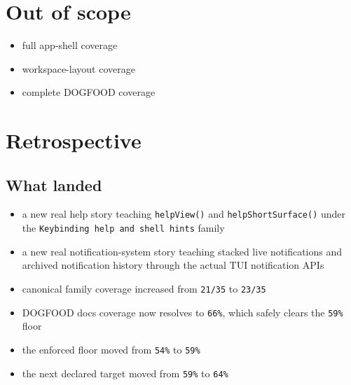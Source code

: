 \section{Out of scope}\label{record-075-out-of-scope}

\begin{itemize}
\tightlist
\item
  full app-shell coverage
\item
  workspace-layout coverage
\item
  complete DOGFOOD coverage
\end{itemize}

\section{Retrospective}\label{record-075-retrospective}

\subsection{What landed}\label{record-075-what-landed}

\begin{itemize}
\tightlist
\item
  a new real help story teaching \texttt{h\allowbreak{}e\allowbreak{}l\allowbreak{}p\allowbreak{}V\allowbreak{}i\allowbreak{}e\allowbreak{}w\allowbreak{}(\allowbreak{})} and \texttt{h\allowbreak{}e\allowbreak{}l\allowbreak{}p\allowbreak{}S\allowbreak{}h\allowbreak{}o\allowbreak{}r\allowbreak{}t\allowbreak{}S\allowbreak{}u\allowbreak{}r\allowbreak{}f\allowbreak{}a\allowbreak{}c\allowbreak{}e\allowbreak{}(\allowbreak{})} under the \texttt{K\allowbreak{}e\allowbreak{}y\allowbreak{}b\allowbreak{}i\allowbreak{}n\allowbreak{}d\allowbreak{}i\allowbreak{}n\allowbreak{}g\allowbreak{} \allowbreak{}h\allowbreak{}e\allowbreak{}l\allowbreak{}p\allowbreak{} \allowbreak{}a\allowbreak{}n\allowbreak{}d\allowbreak{} \allowbreak{}s\allowbreak{}h\allowbreak{}e\allowbreak{}l\allowbreak{}l\allowbreak{} \allowbreak{}h\allowbreak{}i\allowbreak{}n\allowbreak{}t\allowbreak{}s} family
\item
  a new real notification-system story teaching stacked live notifications and archived notification history through the actual TUI notification APIs
\item
  canonical family coverage increased from \texttt{2\allowbreak{}1\allowbreak{}/\allowbreak{}3\allowbreak{}5} to \texttt{2\allowbreak{}3\allowbreak{}/\allowbreak{}3\allowbreak{}5}
\item
  DOGFOOD docs coverage now resolves to \texttt{6\allowbreak{}6\allowbreak{}\%}, which safely clears the \texttt{5\allowbreak{}9\allowbreak{}\%} floor
\item
  the enforced floor moved from \texttt{5\allowbreak{}4\allowbreak{}\%} to \texttt{5\allowbreak{}9\allowbreak{}\%}
\item
  the next declared target moved from \texttt{5\allowbreak{}9\allowbreak{}\%} to \texttt{6\allowbreak{}4\allowbreak{}\%}
\end{itemize}

